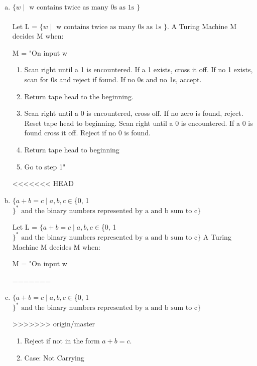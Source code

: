 ﻿\documentclass{article}
\begin{document}
\begin{enumerate}[a)]

\item $\{w \;|\; \text{ w contains twice as many 0s as 1s } \}$
\\ \\Let L = $\{w \;|\; \text{ w contains twice as many 0s as 1s } \}$. A Turing Machine M decides M when:

M = "On input w

\begin{enumerate}[1)]
\item Scan right until a 1 is encountered. If a 1 exists, cross it off. If no 1 exists, scan for 0s and reject if found. If no 0s and no 1s, accept.
\item Return tape head to the beginning.
\item Scan right until a 0 is encountered, cross off. If no zero is found, reject. Reset tape head to beginning. Scan right until a 0 is encountered. If a 0 is found cross it off. Reject if no 0 is found.
\item Return tape head to beginning
\item Go to step 1"
\end{enumerate}

<<<<<<< HEAD

\item  $\{a + b = c \;|\; a, b, c \in $\{0, 1$\}^* \text{ and the binary numbers represented by a and b sum to c} \}$

Let L = $\{a + b = c \;|\; a, b, c \in $\{0, 1$\}^* \text{ and the binary numbers represented by a and b sum to c} \}$ A Turing Machine M decides M when:

M = "On input w

=======
\item  $\{a + b = c \;|\; a, b, c \in $\{0, 1$\}^* \text{ and the binary numbers represented by a and b sum to c} \}$

>>>>>>> origin/master
\begin{enumerate}[1)]

\item Reject if not in the form $a + b = c$.



\item Case: Not Carrying


\end{enumerate}
\end{enumerate}
\end{document}
